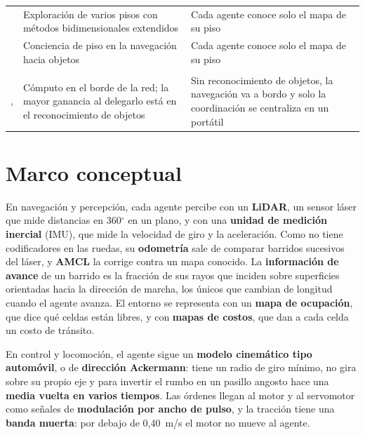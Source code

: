 {\begin{longtable}{@{}>{\raggedright\arraybackslash}p{}>{\raggedright\arraybackslash}p{}>{\raggedright\arraybackslash}p{}@{}}
    \textcite{chen2025lite} & Exploración de varios pisos con métodos bidimensionales extendidos & Cada agente conoce solo el mapa de su piso \\ \addlinespace
    \textcite{gong2026stairway} & Conciencia de piso en la navegación hacia objetos & Cada agente conoce solo el mapa de su piso \\ \addlinespace
    \multicolumn{3}{@{}l}{\textit{Distribución del cómputo}} \\ \addlinespace
    \textcite{tahir2025edge}, \textcite{dordevic2023offloading} & Cómputo en el borde de la red; la mayor ganancia al delegarlo está en el reconocimiento de objetos & Sin reconocimiento de objetos, la navegación va a bordo y solo la coordinación se centraliza en un portátil \\
\end{longtable}}

\section{Marco conceptual}
\label{sec:conceptual}

En navegación y percepción, cada agente percibe con un \textbf{LiDAR}, un sensor láser que mide distancias en 360$^\circ$ en un plano, y con una \textbf{unidad de medición inercial} (IMU), que mide la velocidad de giro y la aceleración. Como no tiene codificadores en las ruedas, su \textbf{odometría} sale de comparar barridos sucesivos del láser, y \textbf{AMCL} la corrige contra un mapa conocido. La \textbf{información de avance} de un barrido es la fracción de sus rayos que inciden sobre superficies orientadas hacia la dirección de marcha, los únicos que cambian de longitud cuando el agente avanza. El entorno se representa con un \textbf{mapa de ocupación}, que dice qué celdas están libres, y con \textbf{mapas de costos}, que dan a cada celda un costo de tránsito.

En control y locomoción, el agente sigue un \textbf{modelo cinemático tipo automóvil}, o de \textbf{dirección Ackermann}: tiene un radio de giro mínimo, no gira sobre su propio eje y para invertir el rumbo en un pasillo angosto hace una \textbf{media vuelta en varios tiempos}. Las órdenes llegan al motor y al servomotor como señales de \textbf{modulación por ancho de pulso}, y la tracción tiene una \textbf{banda muerta}: por debajo de 0,40~m/s el motor no mueve al agente.

